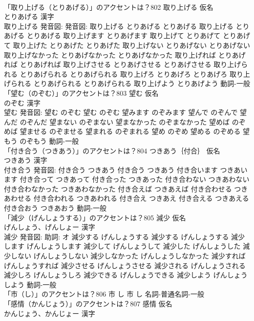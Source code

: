 \documentclass[8pt]{extreport}
\begin{document}
\begin{CJK}{UTF8}{min}
\\	「取り上げる（とりあげる）」のアクセントは？802	取り上げる 仮名　
\\	とりあげる 漢字　
\\	取り上げる 発音図: 発音図:	取り上げる とりあげる とりあげる		取り上げる とりあげる とりあげる 取り上げます とりあげます 取り上げて とりあげて とりあげて 取り上げた とりあげた とりあげた 取り上げない とりあげない とりあげない 取り上げなかった とりあげなかった とりあげなかった 取り上げれば とりあげれば とりあげれば 取り上げさせる とりあげさせる とりあげさせる 取り上げられる とりあげられる とりあげられる 取り上げろ とりあげろ とりあげろ 取り上げられる とりあげられる とりあげられる 取り上げよう とりあげよう				動詞-一般 
\\	「望む（のぞむ）」のアクセントは？803	望む 仮名　
\\	のぞむ 漢字　
\\	望む 発音図:	望む のぞむ		望む のぞむ 望みます のぞみます 望んで のぞんで 望んだ のぞんだ 望まない のぞまない 望まなかった のぞまなかった 望めば のぞめば 望ませる のぞませる 望まれる のぞまれる 望め のぞめ 望める のぞめる 望もう のぞもう				動詞-一般 
\\	「付き合う（つきあう）」のアクセントは？804	つきあう｛付合｝ 仮名　
\\	つきあう 漢字　
\\	付き合う 発音図:	付き合う つきあう		付き合う つきあう 付き合います つきあいます 付き合って つきあって 付き合った つきあった 付き合わない つきあわない 付き合わなかった つきあわなかった 付き合えば つきあえば 付き合わせる つきあわせる 付き合われる つきあわれる 付き合え つきあえ 付き合える つきあえる 付き合おう つきあおう				動詞-一般 
\\	「減少（げんしょうする）」のアクセントは？805	減少 仮名　
\\	げんしょう、げんしょー 漢字　
\\	減少 発音図: 助詞: オ	減少する げんしょうする		減少する げんしょうする 減少します げんしょうします 減少して げんしょうして 減少した げんしょうした 減少しない げんしょうしない 減少しなかった げんしょうしなかった 減少すれば げんしょうすれば 減少させる げんしょうさせる 減少される げんしょうされる 減少しろ げんしょうしろ 減少できる げんしょうできる 減少しよう げんしょうしよう				動詞-一般 
\\	「市（し）」のアクセントは？806		市 し		市 し				名詞-普通名詞-一般 
\\	「感情（かんじょう）」のアクセントは？807	感情 仮名　
\\	かんじょう、かんじょー 漢字　

\end{CJK}
\end{document}
